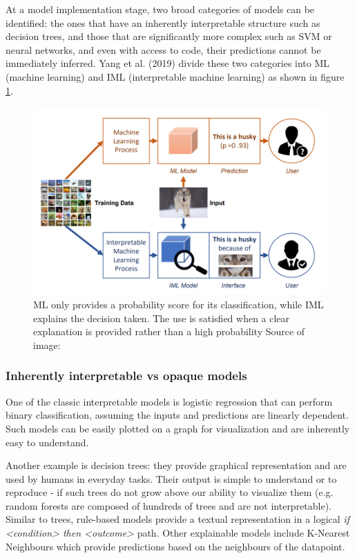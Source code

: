 \documentclass[proposal]{softeng}
\begin{document}
At a model implementation stage, two broad categories of models can be identified: the ones that have an inherently interpretable structure such as decision trees, and those that are significantly more complex such as SVM or neural networks, and even with access to code, their predictions cannot be immediately inferred. Yang et al. (2019) \cite{YangFan2019EEWG} divide these two categories into ML (machine learning) and IML (interpretable machine learning) as shown in figure \ref{fig:iml}.

\begin{figure}[h!]
\centering

\includegraphics[width=.8\textwidth]{images/iml.png}

\caption{ML only provides a probability score for its classification, while IML explains the decision taken. The use is satisfied when a clear explanation is provided rather than a high probability Source of image:\cite{YangFan2019EEWG}}

\label{fig:iml}
\end{figure}

\subsubsection{Inherently interpretable vs opaque models}

One of the classic interpretable models is logistic regression that can perform binary classification, assuming the inputs and predictions are linearly dependent. Such models can be easily plotted on a graph for visualization and are inherently easy to understand.

Another example is decision trees: they provide graphical representation and are used by humans in everyday tasks. Their output is simple to understand or to reproduce - if such trees do not grow above our ability to visualize them (e.g. random forests are composed of hundreds of trees and are not interpretable). Similar to trees, rule-based models provide a textual representation in a logical \textit{if <condition> then <outcome>} path. Other explainable models include K-Nearest Neighbours which provide predictions based on the neighbours of the datapoint.
\end{document}

